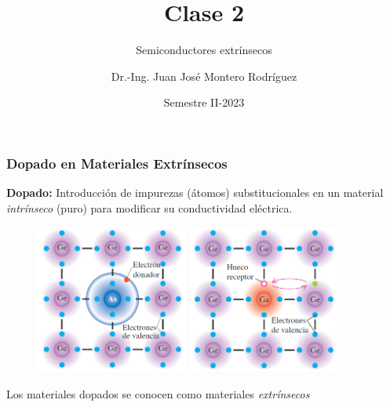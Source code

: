 \documentclass[10pt,t,aspectratio=169]{beamer}
\title{Clase 2}
\subtitle{Semiconductores extrínsecos}
\author{Dr.-Ing. Juan José Montero Rodríguez}
\institute{Escuela de Ingeniería Electrónica}
\date{Semestre II-2023}
\begin{document}
\begin{frame}[t]
\titlepage
\end{frame}


\begin{frame}[t]
  \frametitle{Dopado en Materiales Extrínsecos}

  \textbf{Dopado:} Introducción de impurezas (átomos) substitucionales en un material \textit{intrínseco} (puro) para modificar su conductividad eléctrica.

  \begin{figure}[H]
    \centering
    \includegraphics[width=5cm]{./figures/dopado1.png}
    \hspace{1cm}
    \includegraphics[width=5cm]{./figures/dopado2.png}
  \end{figure}
  
  \centering
  Los materiales dopados se conocen como materiales \textit{extrínsecos}
\end{frame}
\end{document}
